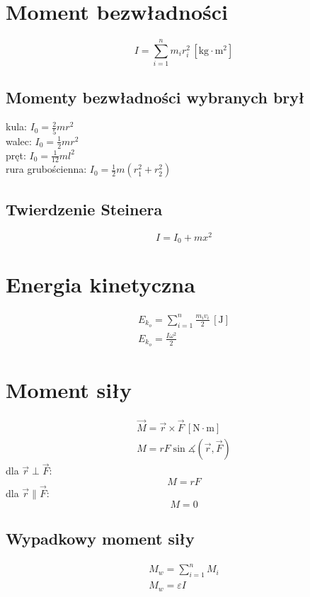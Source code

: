 \documentclass{report}
\numberwithin{equation}{chapter}
\newcommand{\unit}[1]{\,\left[\mathrm{#1}\right]}
\begin{document}
    \section{Moment bezwładności}
      \begin{equation}
        I = \sum_{i=1}^n m_ir_i^2 \unit{kg\cdot m^2}
      \end{equation}
        \subsection{Momenty bezwładności wybranych brył}
        kula: $I_0 = \frac{2}{5}mr^2$\\
        walec: $I_0 = \frac{1}{2}mr^2$\\
        pręt: $I_0 = \frac{1}{12}ml^2$\\
        rura grubościenna: $I_0 = \frac{1}{2}m(r_1^2 + r_2^2)$
      \subsection{Twierdzenie Steinera}
        \begin{equation}
          I = I_0 +mx^2
        \end{equation}
    \section{Energia kinetyczna}
      \begin{gather}
        E_{k_o} = \sum_{i=1}^n \frac{m_iv_i}{2} \unit{J}\\
        E_{k_o} = \frac{I\omega^2}{2}
      \end{gather}
    \section{Moment siły}
      \begin{gather}
        \vec M = \vec r\times\vec F \unit{N\cdot m}\\
        M = rF\sin\measuredangle(\vec r, \vec F)
      \end{gather}
      dla $\vec r \perp \vec F$:
      \begin{equation}
        M = rF
      \end{equation}
      dla $\vec r \parallel \vec F$:
      \begin{equation}
        M = 0
      \end{equation}
      \subsection{Wypadkowy moment siły}
        \begin{gather}
          M_w = \sum_{i=1}^n M_i\\
          M_w = \varepsilon I
        \end{gather}
\end{document}
